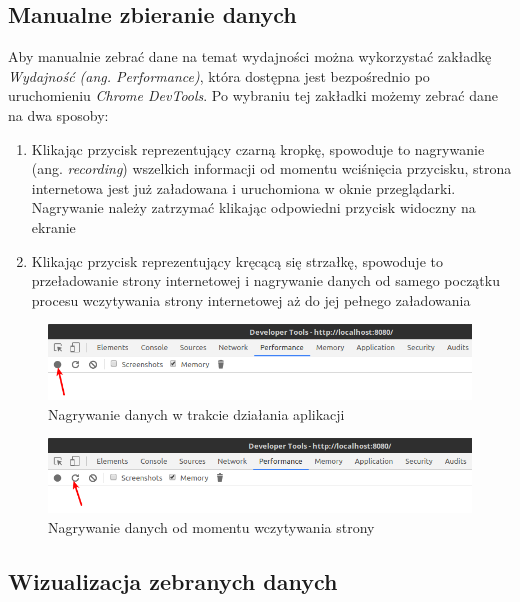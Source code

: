 \documentclass[polish, twoside, 12pt]{mwart}
\begin{document}
\subsection{Manualne zbieranie danych}
Aby manualnie zebrać dane na temat wydajności można wykorzystać zakładkę \emph{Wydajność (ang. Performance)}, która dostępna jest bezpośrednio po uruchomieniu \emph{Chrome DevTools}. Po wybraniu tej zakładki możemy zebrać dane na dwa sposoby:

\begin{enumerate}
  \item Klikając przycisk reprezentujący czarną kropkę, spowoduje to nagrywanie (ang. \emph{recording}) wszelkich informacji od momentu wciśnięcia przycisku, strona internetowa jest już załadowana i uruchomiona w oknie przeglądarki. Nagrywanie należy zatrzymać klikając odpowiedni przycisk widoczny na ekranie
  \item Klikając przycisk reprezentujący kręcącą się strzałkę, spowoduje to przeładowanie strony internetowej i nagrywanie danych od samego początku procesu wczytywania strony internetowej aż do jej pełnego załadowania
\end{enumerate}

\begin{figure}[ht]
  \includegraphics[width=\textwidth]{chrome-devtools-performance-recording-runtime.png}
	\caption{Nagrywanie danych w trakcie działania aplikacji}
\end{figure} 

\begin{figure}[ht]
  \includegraphics[width=\textwidth]{chrome-devtools-performance-recording-reload.png}
	\caption{Nagrywanie danych od momentu wczytywania strony}
\end{figure}

\subsection{Wizualizacja zebranych danych}
\end{document}
